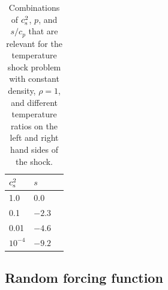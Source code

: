\documentclass[\mydriver,12pt,twoside,notitlepage,a4paper]{article}
\begin{document}
\begin{table}[htb]
  \begin{center}
    \caption{
        Combinations of $c_{\rm s}^2$, $p$, and $s/c_p$ that are
        relevant for the temperature shock problem with constant density,
        $\rho=1$, and different temperature ratios on the left and
        right hand sides of the shock.
    }
    \label{Tshock2}
    \begin{tabular}{lll}
    \toprule
$c_{\rm s}^2$  &  $s$  \\
    \midrule
   1.0    &$ 0.0$ \\
   0.1    &$-2.3$ \\
   0.01   &$-4.6$ \\
$10^{-4}$ &$-9.2$ \\
    \bottomrule
    \end{tabular}
  \end{center}
\end{table}


\subsection{Random forcing function}
\label{SRandomForcingFunction}
\end{document}
